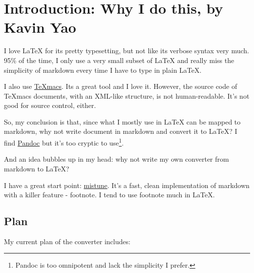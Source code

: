 \documentclass[a4paper, 11pt, titlepage, openany]{article}
\author{Git Cordier \\\texttt{admin@gcordier.eu}}\setlength\parindent{0pt}
\begin{document}
\maketitle
\tableofcontents\newpage





\newcommand{\vardoc}[1]{\$\{#1\}}

\section{Introduction: Why I do this, by Kavin Yao}

I love \LaTeX{} for its pretty typesetting, but not like its verbose syntax very much. 95\% of the time, I only use a very small subset of \LaTeX{} and really miss the simplicity of markdown every time I have to type in plain \LaTeX{}.

I also use \href{http://www.texmacs.org/tmweb/home/welcome.en.html}{TeX{}macs}. Its a great tool and I love it. However, the source code of TeX{}macs documents, with an XML-like structure, is not human-readable. It's not good for source control, either.

So, my conclusion is that, since what I mostly use in \LaTeX{} can be mapped to markdown, why not write document in markdown and convert it to \LaTeX{}? I find \href{http://johnmacfarlane.net/pandoc/}{Pandoc} but it's too cryptic to use\footnote{Pandoc is too omnipotent and lack the simplicity I prefer.}.

And an idea bubbles up in my head: why not write my own converter from markdown to \LaTeX{}?

I have a great start point: \href{https://github.com/lepture/mistune}{mistune}. It's a fast, clean implementation of markdown with a killer feature - footnote. I tend to use footnote much in \LaTeX{}.

\subsection{Plan}

My current plan of the converter includes:
\end{document}
